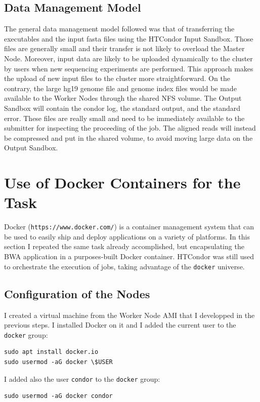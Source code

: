 \documentclass{article}
\begin{document}
\subsection{Data Management Model}
The general data management model followed was that of transferring the executables and the input fasta files using the HTCondor Input Sandbox.
Those files are generally small and their transfer is not likely to overload the Master Node.
Moreover, input data are likely to be uploaded dynamically to the cluster by users when new sequencing experiments are performed.
This approach makes the upload of new input files to the cluster more straightforward.
On the contrary, the large hg19 genome file and genome index files would be made available to the Worker Nodes through the shared NFS volume.
The Output Sandbox will contain the condor log, the standard output, and the standard error.
These files are really small and need to be immediately available to the submitter for inspecting the proceeding of the job.
The aligned reads will instead be compressed and put in the shared volume, to avoid moving large data on the Output Sandbox.

\section{Use of Docker Containers for the Task}
Docker (\texttt{https://www.docker.com/}) is a container management system that can be used to easily ship and deploy applications on a variety of platforms.
In this section I repeated the same task already accomplished, but encapsulating the BWA application in a purposes-built Docker container.
HTCondor was still used to orchestrate the execution of jobs, taking advantage of the \texttt{docker} universe.

\subsection{Configuration of the Nodes}
I created a virtual machine from the Worker Node AMI that I developped in the previous steps.
I installed Docker on it and I added the current user to the \texttt{docker} group:
\begin{lstlisting}
sudo apt install docker.io
sudo usermod -aG docker \$USER
\end{lstlisting}
I added also the user \texttt{condor} to the \texttt{docker} group:
\begin{lstlisting}
sudo usermod -aG docker condor
\end{lstlisting}
\end{document}
